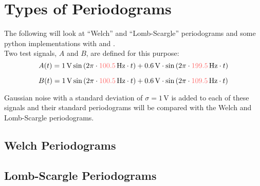 \section{Types of Periodograms}

The following will look at ``Welch'' and ``Lomb-Scargle'' periodograms and some python implementations with  and .\\

Two test signals, $A$ and $B$, are defined for this purpose:
\[
  A(t) = 1\,\si{\volt}\sin{(2\pi \cdot {\color{red-5}100.5}\,\si{\hertz}\cdot t) + 0.6\,\si{\volt}\cdot\sin{(2\pi\cdot {\color{red-5}199.5}\,\si{\hertz}\cdot t)}}
\]

\[
  B(t) = 1\,\si{\volt}\sin{(2\pi \cdot {\color{red-5}{100.5}}\,\si{\hertz}\cdot t) + 0.6\,\si{\volt}\cdot\sin{(2\pi\cdot {\color{red-5}{109.5}}\,\si{\hertz}\cdot t)}}
\]

Gaussian noise with a standard deviation of $\sigma=1\,\si{\volt}$ is added to each of these signals and their standard periodograms will be compared with the Welch and Lomb-Scargle periodograms.

\subsection{Welch Periodograms}


\subsection{Lomb-Scargle Periodograms}

